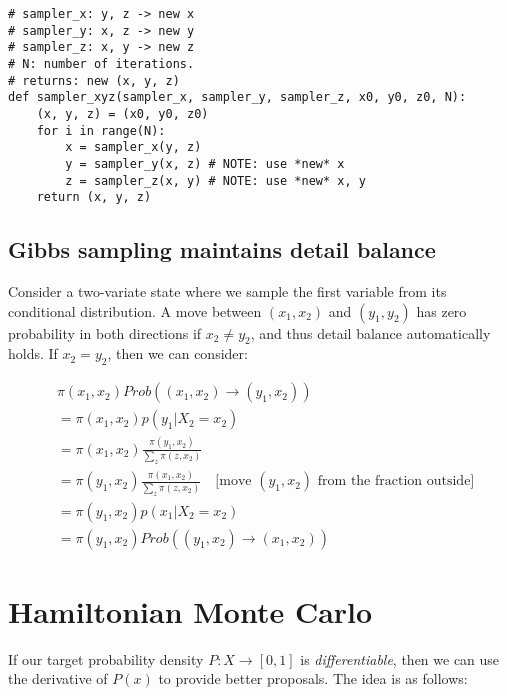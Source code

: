 \documentclass[titlepage]{article}
\begin{document}
\begin{verbatim}
# sampler_x: y, z -> new x
# sampler_y: x, z -> new y
# sampler_z: x, y -> new z
# N: number of iterations.
# returns: new (x, y, z)
def sampler_xyz(sampler_x, sampler_y, sampler_z, x0, y0, z0, N):
    (x, y, z) = (x0, y0, z0)
    for i in range(N):
        x = sampler_x(y, z)
        y = sampler_y(x, z) # NOTE: use *new* x
        z = sampler_z(x, y) # NOTE: use *new* x, y
    return (x, y, z)
\end{verbatim}

\subsection{Gibbs sampling maintains detail balance}
Consider a two-variate state where we sample the first variable from its conditional distribution.
A move between  $(x_1, x_2)$ and $(y_1, y_2)$ has zero probability in both directions
if $x_2\neq y_2$, and thus detail balance automatically holds. If $x_2 = y_2$, then
we can consider:

\begin{align*}
&\pi(x_1, x_2)  Prob((x_1, x_2) \rightarrow (y_1, x_2)) \\
&= \pi(x_1, x_2) p(y_1 | X_2 = x_2) \\
&= \pi(x_1, x_2) \frac{\pi(y_1, x_2)}{\sum_z \pi(z, x_2)} \\
&= \pi(y_1, x_2) \frac{\pi(x_1, x_2)}{\sum_z \pi(z, x_2)} \quad \text{[move $(y_1, x_2)$ from the fraction outside]} \\
&=\pi(y_1, x_2) p(x_1 | X_2 = x_2) \\
&= \pi(y_1, x_2) Prob((y_1, x_2) \rightarrow (x_1, x_2))
\end{align*}

\section{Hamiltonian Monte Carlo}

If our target probability density $P: X \rightarrow [0, 1]$ is \emph{differentiable},
then we can use the derivative of $P(x)$ to provide better proposals. The idea
is as follows:
\end{document}
